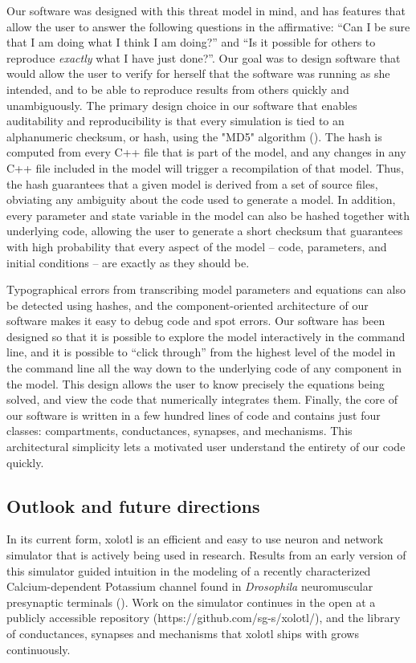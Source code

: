 \documentclass{frontiersSCNS} %
\begin{document}
Our software was designed with this threat model in mind, and has features that allow the user to answer the following questions in the affirmative: ``Can I be sure that I am doing what I think I am doing?'' and ``Is it possible for others to reproduce {\em exactly} what I have just done?''. Our goal was to design software that would allow the user to verify for herself that the software was running as she intended, and to be able to reproduce results from others quickly and unambiguously. The primary design choice in our software that enables auditability and reproducibility is that every simulation is tied to an alphanumeric checksum, or hash, using the "MD5" algorithm (\cite{rivestMD5MessageDigestAlgorithm1992}). The hash is computed from every C++ file that is part of the model, and any changes in any C++ file included in the model will trigger a recompilation of that model. Thus, the hash guarantees that a given model is derived from a set of source files, obviating any ambiguity about the code used to generate a model. In addition, every parameter and state variable in the model can also be hashed together with underlying code, allowing the user to generate a short checksum that guarantees with high probability that every aspect of the model -- code, parameters, and initial conditions -- are exactly as they should be.

Typographical errors from transcribing model parameters and equations can also be detected using hashes, and the component-oriented architecture of our software makes it easy to debug code and spot errors. Our software has been designed so that it is possible to explore the model interactively in the command line, and it is possible to ``click through'' from the highest level of the model in the command line all the way down to the underlying code of any component in the model. This design allows the user to know precisely the equations being solved, and view the code that numerically integrates them. Finally, the core of our software is written in a few hundred lines of code and contains just four classes: compartments, conductances, synapses, and mechanisms. This architectural simplicity lets a motivated user understand the entirety of our code quickly. 

\subsection{Outlook and future directions}

In its current form, xolotl is an efficient and easy to use neuron and network simulator that is actively being used in research. 
Results from an early version of this simulator guided intuition in the modeling of a recently characterized Calcium-dependent Potassium channel found in {\em Drosophila} neuromuscular presynaptic terminals (\cite{bronk2018regulation}). Work on the simulator continues in the open at a publicly accessible repository (https://github.com/sg-s/xolotl/), and the library of conductances, synapses and mechanisms that xolotl ships with grows continuously. 
\end{document}
